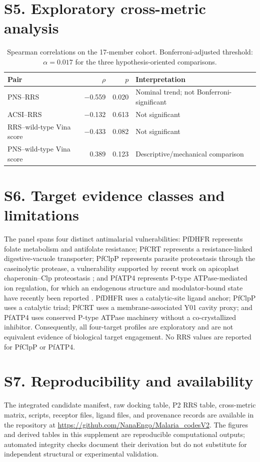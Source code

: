 \documentclass[journal=jcisd8,manuscript=suppinfo]{achemso}
\begin{document}
\section*{S5. Exploratory cross-metric analysis}
\begin{table}[h]
\centering
\caption{Spearman correlations on the 17-member cohort. Bonferroni-adjusted threshold: $\alpha=\num{0.017}$ for the three hypothesis-oriented comparisons.}
\label{tab:crossmetric}
\begin{tabular}{@{}lrrl@{}}
\toprule
Pair & $\rho$ & $p$ & Interpretation \\
\midrule
PNS--RRS & \num{-0.559} & \num{0.020} & Nominal trend; not Bonferroni-significant \\
ACSI--RRS & \num{-0.132} & \num{0.613} & Not significant \\
RRS--wild-type Vina score & \num{-0.433} & \num{0.082} & Not significant \\
PNS--wild-type Vina score & \num{0.389} & \num{0.123} & Descriptive/mechanical comparison \\
\bottomrule
\end{tabular}
\end{table}

\section*{S6. Target evidence classes and limitations}
The panel spans four distinct antimalarial vulnerabilities: PfDHFR represents folate metabolism and antifolate resistance; PfCRT represents a resistance-linked digestive-vacuole transporter; PfClpP represents parasite proteostasis through the caseinolytic protease, a vulnerability supported by recent work on apicoplast chaperonin--Clp proteostasis \cite{Tissawak2025}; and PfATP4 represents P-type ATPase-mediated ion regulation, for which an endogenous structure and modulator-bound state have recently been reported \cite{Haile2025}. PfDHFR uses a catalytic-site ligand anchor; PfClpP uses a catalytic triad; PfCRT uses a membrane-associated Y01 cavity proxy; and PfATP4 uses conserved P-type ATPase machinery without a co-crystallized inhibitor. Consequently, all four-target profiles are exploratory and are not equivalent evidence of biological target engagement. No RRS values are reported for PfClpP or PfATP4.

\section*{S7. Reproducibility and availability}
The integrated candidate manifest, raw docking table, P2 RRS table, cross-metric matrix, scripts, receptor files, ligand files, and provenance records are available in the repository at \url{https://github.com/NanaEngo/Malaria_codesV2}. The figures and derived tables in this supplement are reproducible computational outputs; automated integrity checks document their derivation but do not substitute for independent structural or experimental validation.
\end{document}
